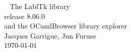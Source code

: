 \documentclass[11pt]{book}
\begin{document}
\thispagestyle{empty}
\begin{center}
~\vfill
\Huge           The LablTk library \\
                release 8.06.0 \\
                and the OCamlBrowser library explorer \\[1cm]
\large          Jacques Garrigue, Jun Furuse \\
                \today \\
\vfill
\end{center}
\setcounter{page}{1}



\end{document}
